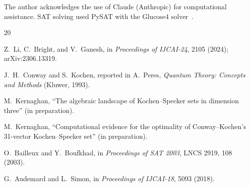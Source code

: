 \documentclass[twocolumn,prl,superscriptaddress,nofootinbib]{revtex4-2}
\begin{document}
\begin{acknowledgments}
The author acknowledges the use of Claude (Anthropic) for computational assistance.  SAT solving used PySAT with the Glucose4 solver~\cite{AudemardSimon2018}.
\end{acknowledgments}

\begin{thebibliography}{20}

Z.~Li, C.~Bright, and V.~Ganesh,
in \textit{Proceedings of IJCAI-24}, 2105 (2024); arXiv:2306.13319.

J.~H.~Conway and S.~Kochen,
reported in A.~Peres, \textit{Quantum Theory: Concepts and Methods} (Kluwer, 1993).

M.~Kernaghan,
``The algebraic landscape of Kochen--Specker sets in dimension three'' (in preparation).

M.~Kernaghan,
``Computational evidence for the optimality of Conway--Kochen's 31-vector Kochen--Specker set'' (in preparation).

O.~Bailleux and Y.~Boufkhad,
in \textit{Proceedings of SAT 2003}, LNCS 2919, 108 (2003).

G.~Audemard and L.~Simon,
in \textit{Proceedings of IJCAI-18}, 5093 (2018).

\end{thebibliography}
\end{document}
